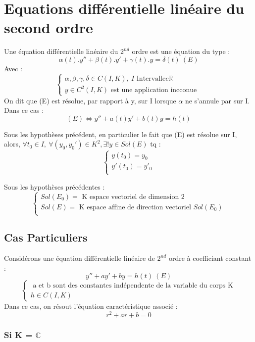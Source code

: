 \section{Equations différentielle linéaire du second ordre}
\begin{de}
Une équation différentielle linéaire du $2^{nd}$ ordre est une équation du type : 
$$\alpha(t).y'' + \beta(t).y' + \gamma(t).y = \delta(t)~ (E)$$
Avec : 
$$\begin{cases}
   \alpha,\beta,\gamma,\delta \in C(I,K),~ I \mbox{ Intervalle} c \mathbb{R} \\ 
   y \in C^2(I,K) \mbox{ est une application incconue }
  \end{cases}
$$
On dit que (E) est résolue, par rapport à y, sur I lorsque $\alpha$ ne s'annule par sur I. Dans ce cas : 
$$(E) \Leftrightarrow y'' + a(t)y' + b(t)y = h(t)$$
\end{de}
\begin{theo}
Sous les hypothèses précédent, en particulier le fait que (E) est résolue sur I, alors, $\forall t_0 \in I,~ \forall(y_0,y_0')\in K^2, \exists! y\in Sol(E)$ tq :
$$\begin{cases}
   y(t_0) = y_0 \\
   y'(t_0) = y'_0 \\
  \end{cases}
$$
\end{theo}
\begin{coro}
Sous les hypothèses précédentes : 
$$\begin{cases}
   Sol(E_0) = \mbox{ K espace vectoriel de dimension 2} \\
   Sol(E) = \mbox{ K espace affine de direction vectoriel } Sol(E_0) \\
  \end{cases}
$$
\end{coro}
\subsection{Cas Particuliers}
Considérons une équation différentielle linéaire de $2^{nd}$ ordre à coefficiant constant : 
$$y'' + ay' + by = h(t)~ (E)$$
$$\begin{cases}
   \mbox{ a et b sont des constantes indépendente de la variable du corps K} \\
   h \in C(I,K)
  \end{cases}
$$
Dans ce cas, on résout l'équation caractéristique associé : 
$$r^2 + ar + b = 0$$
\subsubsection{Si K = $\mathbb{C}$}
